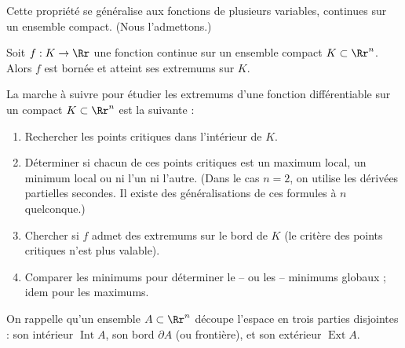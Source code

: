 Cette propriété se généralise aux fonctions de plusieurs variables, continues sur un ensemble compact. (Nous l'admettons.)

\begin{proposition}{}{}
Soit $f : K \rightarrow \Rr$ une fonction continue sur un ensemble compact $K \subset \Rr^n$. Alors $f$ est bornée et atteint ses extremums sur $K$.
\end{proposition}

La marche à suivre pour étudier les extremums d'une fonction différentiable sur un compact $K \subset \Rr^n$ est la suivante :
\begin{enumerate}
    \item Rechercher les points critiques dans l'intérieur de $K$.
    \item Déterminer si chacun de ces points critiques est un maximum local, un minimum local ou ni l'un ni l'autre. (Dans le cas $n=2$, on utilise les dérivées partielles secondes. Il existe des généralisations de ces formules à $n$ quelconque.)
    \item Chercher si $f$ admet des extremums sur le bord de $K$ (le critère des points critiques n'est plus valable).
    \item Comparer les minimums pour déterminer le -- ou les -- minimums globaux  ; idem pour les maximums.
\end{enumerate}

On rappelle qu'un ensemble $A \subset \Rr^n$ découpe l'espace en trois parties disjointes : son intérieur $\operatorname{Int} A$, son bord $\partial A$ (ou frontière), et son extérieur $\operatorname{Ext} A$.





